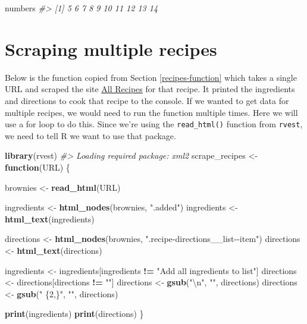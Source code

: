 \documentclass[
  12pt,
]{book}
\newenvironment{Shaded}{\begin{snugshade}}{\end{snugshade}}
\newcommand{\CharTok}[1]{\textcolor[rgb]{0.31,0.60,0.02}{#1}}
\newcommand{\CommentTok}[1]{\textcolor[rgb]{0.56,0.35,0.01}{\textit{#1}}}
\newcommand{\ControlFlowTok}[1]{\textcolor[rgb]{0.13,0.29,0.53}{\textbf{#1}}}
\newcommand{\KeywordTok}[1]{\textcolor[rgb]{0.13,0.29,0.53}{\textbf{#1}}}
\newcommand{\NormalTok}[1]{#1}
\newcommand{\OperatorTok}[1]{\textcolor[rgb]{0.81,0.36,0.00}{\textbf{#1}}}
\newcommand{\StringTok}[1]{\textcolor[rgb]{0.31,0.60,0.02}{#1}}
\begin{document}
\begin{Shaded}
\begin{Highlighting}[]
\NormalTok{numbers}
\CommentTok{\#>  [1]  5  6  7  8  9 10 11 12 13 14}
\end{Highlighting}
\end{Shaded}

\hypertarget{scraping-multiple-recipes}{%
\section{Scraping multiple recipes}\label{scraping-multiple-recipes}}

Below is the function copied from Section \ref{recipes-function} which takes a single URL and scraped the site \href{https://www.allrecipes.com/}{All Recipes} for that recipe. It printed the ingredients and directions to cook that recipe to the console. If we wanted to get data for multiple recipes, we would need to run the function multiple times. Here we will use a for loop to do this. Since we're using the \texttt{read\_html()} function from \texttt{rvest}, we need to tell R we want to use that package.

\begin{Shaded}
\begin{Highlighting}[]
\KeywordTok{library}\NormalTok{(rvest)}
\CommentTok{\#> Loading required package: xml2}
\NormalTok{scrape\_recipes <{-}}\StringTok{ }\ControlFlowTok{function}\NormalTok{(URL) \{}
  
\NormalTok{  brownies <{-}}\StringTok{ }\KeywordTok{read\_html}\NormalTok{(URL)}
  
\NormalTok{  ingredients <{-}}\StringTok{ }\KeywordTok{html\_nodes}\NormalTok{(brownies, }\StringTok{".added"}\NormalTok{)}
\NormalTok{  ingredients <{-}}\StringTok{ }\KeywordTok{html\_text}\NormalTok{(ingredients)}
  
\NormalTok{  directions <{-}}\StringTok{ }\KeywordTok{html\_nodes}\NormalTok{(brownies, }\StringTok{".recipe{-}directions\_\_list{-}{-}item"}\NormalTok{)}
\NormalTok{  directions <{-}}\StringTok{ }\KeywordTok{html\_text}\NormalTok{(directions)}
  
\NormalTok{  ingredients <{-}}\StringTok{ }\NormalTok{ingredients[ingredients }\OperatorTok{!=}\StringTok{ "Add all ingredients to list"}\NormalTok{]}
\NormalTok{  directions  <{-}}\StringTok{ }\NormalTok{directions[directions }\OperatorTok{!=}\StringTok{ ""}\NormalTok{]}
\NormalTok{  directions  <{-}}\StringTok{ }\KeywordTok{gsub}\NormalTok{(}\StringTok{"}\CharTok{\textbackslash{}n}\StringTok{"}\NormalTok{, }\StringTok{""}\NormalTok{, directions)}
\NormalTok{  directions  <{-}}\StringTok{ }\KeywordTok{gsub}\NormalTok{(}\StringTok{" \{2,\}"}\NormalTok{, }\StringTok{""}\NormalTok{, directions)}
  
  \KeywordTok{print}\NormalTok{(ingredients)}
  \KeywordTok{print}\NormalTok{(directions)}
\NormalTok{\}}
\end{Highlighting}
\end{Shaded}
\end{document}
